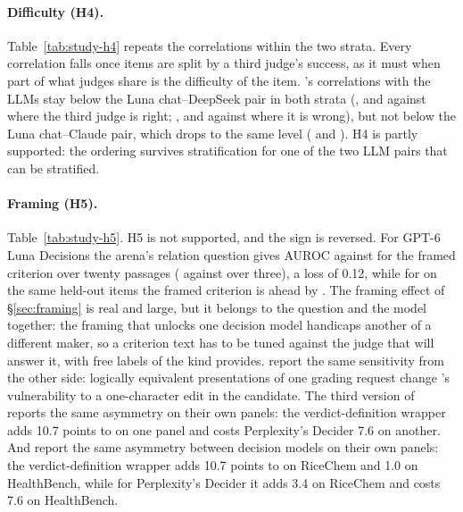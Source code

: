 \paragraph{Difficulty (H4).} Table~\ref{tab:study-h4} repeats the correlations within the two strata. Every correlation falls once items are split by a third judge's success, as it must when part of what judges share is the difficulty of the item. \jev{}'s correlations with the LLMs stay below the Luna chat--DeepSeek pair in both strata (\studyHFourRightJevThreeLunaChat{}, \studyHFourRightJevThreeDeepseekPro{} and \studyHFourRightJevThreeClaude{} against \studyHFourRightLunaChatDeepseekPro{} where the third judge is right; \studyHFourWrongJevThreeLunaChat{}, \studyHFourWrongJevThreeDeepseekPro{} and \studyHFourWrongJevThreeClaude{} against \studyHFourWrongLunaChatDeepseekPro{} where it is wrong), but not below the Luna chat--Claude pair, which drops to the same level (\studyHFourRightLunaChatClaude{} and \studyHFourWrongLunaChatClaude{}). H4 is partly supported: the ordering survives stratification for one of the two LLM pairs that can be stratified.

\begin{table}[t]
\centering\small
{}
\caption{H5: AUROC on numeric held-out items of the arena's relation question against the framed criterion, same input text, for the second decision model; \jev{} from the pilot for reference.}
\label{tab:study-h5}
\end{table}

\paragraph{Framing (H5).} Table~\ref{tab:study-h5}. H5 is not supported, and the sign is reversed. For GPT-6 Luna Decisions the arena's relation question gives AUROC \studyHFiveLooseGPTSixLunaDecisionsTwoZeroPassages{} against \studyHFiveFramedGPTSixLunaDecisionsTwoZeroPassages{} for the framed criterion over twenty passages (\studyHFiveLooseGPTSixLunaDecisionsTopThree{} against \studyHFiveFramedGPTSixLunaDecisionsTopThree{} over three), a loss of 0.12, while for \jev{} on the same held-out items the framed criterion is ahead by \studyHFiveGainJevTwoZeroPassagesPilot{}. The framing effect of \S\ref{sec:framing} is real and large, but it belongs to the question and the model together: the framing that unlocks one decision model handicaps another of a different maker, so a criterion text has to be tuned against the judge that will answer it, with free labels of the kind \dc{} provides. \citet{liu2026cues} report the same sensitivity from the other side: logically equivalent presentations of one grading request change \jev{}'s vulnerability to a one-character edit in the candidate. The third version of \citet{rao2026jev} reports the same asymmetry on their own panels: the verdict-definition wrapper adds 10.7 points to \jev{} on one panel and costs Perplexity's Decider 7.6 on another. And \citet{rao2026jev} report the same asymmetry between decision models on their own panels: the verdict-definition wrapper adds 10.7 points to \jev{} on RiceChem and 1.0 on HealthBench, while for Perplexity's Decider it adds 3.4 on RiceChem and costs 7.6 on HealthBench.

